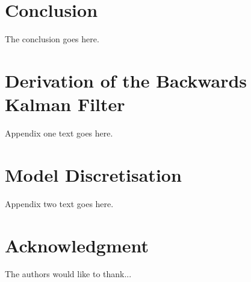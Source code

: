 \documentclass[journal]{IEEEtran}
\begin{document}
\section{Conclusion}
The conclusion goes here.






%


\appendices
\section{Derivation of the Backwards Kalman Filter} \label{app:backward_filter}
Appendix one text goes here.

\section{Model Discretisation} \label{app:model_discretisation}
Appendix two text goes here.


\section*{Acknowledgment}


The authors would like to thank...


\ifCLASSOPTIONcaptionsoff
  \newpage
\fi
\end{document}
